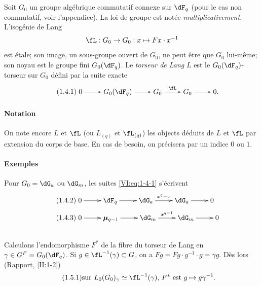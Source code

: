 \documentclass[oneside]{book}
\newcommand{\dmu}{{\bm\mu}}
\theoremstyle{sga-source}
\theoremstyle{sga-source-dash}
\theoremstyle{sga-source-dotdash}
\theoremstyle{sga-source-number-note-dash}
\theoremstyle{sga-source-note-number-dotdash}
\theoremstyle{sga-source-example-dotdash}
\theoremstyle{sga-source-inline-number}
\theoremstyle{sga-source-bare-number}
\theoremstyle{sga-source}
\newcommand{\PrintPage}[1]{}\newcommand{\MathPage}[1]{}\newcommand{\PrintCite}[2]{#1}\newcommand{\var}[3]{#1}
\begin{document}
Soit $G_0$ un groupe algébrique commutatif connexe sur $\dF_q$ (pour le cas 
non commutatif, voir l'appendice). La loi de groupe est notée 
\emph{multiplicativement}. L'isogénie de Lang 
\[
\fL:G_0 \to G_0: x\mapsto F x\cdot x^{-1}
\]
est étale; son image, un sous-groupe ouvert de $G_0$, ne peut être que 
$G_0$ lui-même; son noyau est le groupe fini $G_0(\dF_q)$. Le \emph{torseur 
de Lang} $L$ est le $G_0(\dF_q)$-torseur sur $G_0$ défini par la suite 
exacte 
\begin{equation*}\tag{1.4.1}\label{VI:eq:1-4-1}
\xymatrix{
  0 \ar[r] 
    & G_0(\dF_q) \ar[r] 
    & G_0 \ar[r]^-\fL 
    & G_0 \ar[r] 
    & 0 \text{.}
}
\end{equation*}


\paragraph{Notation}
On note encore $L$ et $\fL$ (ou $L_{(q)}$ et $\fL_{(q)}$) les \var{objects}{objets}{S45-SOL-0682} déduits 
de $L$ et $\fL$ par extension du corps de base. En cas de besoin, on 
précisera par un indice $0$ ou $1$.


\PrintPage{172}
\paragraph{Exemples}
Pour $G_0=\dG_a$ ou $\dG_m$, les suites \eqref{VI:eq:1-4-1} s'écrivent 
\begin{align*}\tag{1.4.2}\label{VI:eq:1-4-2}
&\xymatrix{
  0 \ar[r] 
    & \dF_q \ar[r] 
    & \dG_a \ar[r]^-{x^q-x} 
    & \dG_a \ar[r] 
    & 0 
} \\
\tag{1.4.3}\label{VI:eq:1-4-3}
&\xymatrix{
  0 \ar[r] 
    & \dmu_{q-1} \ar[r] 
    & \dG_m \ar[r]^-{x^{q-1}} 
    & \dG_m \ar[r] 
    & 0
}
\end{align*}





\subsection{}\label{VI:1-5}

Calculons l'endomorphisme $F^\ast$ de la fibre du torseur de Lang en 
$\gamma\in G^F=G_0(\dF_q)$. Si $g\in \fL^{-1}(\gamma)\subset G$, on a 
$F g = F g\cdot g^{-1}\cdot g = \gamma g$. Dès lors (\hyperref[II]{Rapport}, 
\ref{II:1-2}) 
\begin{equation*}\tag{1.5.1}\label{VI:eq:1-5-1}
  \text{sur $L_0(G_0)_\gamma\simeq \fL^{-1}(\gamma)$, $F^\ast$ est $g\mapsto g\gamma^{-1}$.}
\end{equation*}
\end{document}
